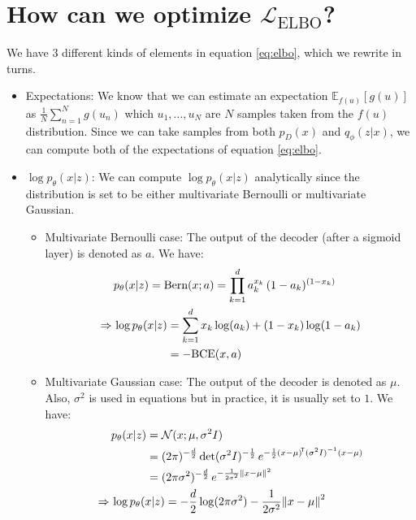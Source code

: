 \documentclass{article}
\newcommand{\nm}{\Rightarrow \,}
\begin{document}
\section{How can we optimize \texorpdfstring{$\mathcal{L}_\text{ELBO}$}{ELBO}?}
We have 3 different kinds of elements in equation \ref{eq:elbo}, which we rewrite in turns.
\begin{itemize}
	\item Expectations:
		We know that we can estimate an expectation $\mathbb{E}_{f(u)}[g(u)]$ as $\frac{1}{N} \sum_{n=1}^{N} g(u_n)$ which $u_1, \dots, u_N$ are $N$ samples taken from the $f(u)$ distribution. Since we can take samples from both $p_D(x)$ and $q_\phi(z|x)$, we can compute both of the expectations of equation \ref{eq:elbo}.
	\item $\log p_\theta(x|z)$:
		We can compute $\log p_\theta(x|z)$ analytically since the distribution is set to be either multivariate Bernoulli or multivariate Gaussian.
		\begin{itemize}
			\item Multivariate Bernoulli case: The output of the decoder (after a sigmoid layer) is denoted as $a$. We have:
				\begin{equation}
					\begin{alignedat}{4}
						& p_\theta (x | z) = \text{Bern}(x; a) = \prod_{k=1}^{d} a_k^{x_k}\, (1-a_k)^{(1-x_k)} \span \span \\
						\nm & \log p_\theta (x | z) && = \sum_{k=1}^{d} x_k \log(a_k) + (1-x_k) \log(1-a_k) \\
						&&& = - \text{BCE}(x, a)
					\end{alignedat}
				\end{equation}
			\item  Multivariate Gaussian case: The output of the decoder is denoted as $\mu$. Also, $\sigma^2$ is used in equations but in practice, it is usually set to $1$. We have:
				\begin{equation}
					\begin{alignedat}{6}
						& p_\theta (x | z) && = \mathcal{N}(x; \mu, \sigma^2 I) \span \span \\
						&&& = (2 \pi )^{-{\frac {d}{2}}} \det({\sigma^2 I})^{-{\frac {1}{2}}} \, e^{ -{\frac {1}{2}} (x -{\mu})^{\!{\mathsf {T}}}{(\sigma^2 I)}^{-1}(x -{\mu}) } \span \span \\
						&&& = (2 \pi \sigma^2)^{-{\frac {d}{2}}} \, e^{ -{\frac {1}{2 \sigma^2}} {\Vert x -\mu \Vert}^2 } \span \span \\
						\nm & \span \span \log p_\theta (x | z) && = -{\frac {d}{2}} \log(2 \pi \sigma^2) - {\frac {1}{2 \sigma^2}} {\Vert x - \mu \Vert}^2 \\

\end{alignedat}
\end{equation}
\end{itemize}
\end{itemize}
\end{document}
